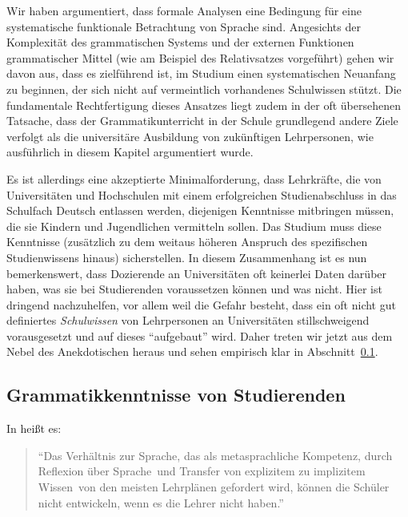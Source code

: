 Wir haben argumentiert, dass formale Analysen eine Bedingung für eine systematische funktionale Betrachtung von Sprache sind.
Angesichts der Komplexität des grammatischen Systems und der externen Funktionen grammatischer Mittel (wie am Beispiel des Relativsatzes vorgeführt) gehen wir davon aus, dass es zielführend ist, im Studium einen systematischen Neuanfang zu beginnen, der sich nicht auf vermeintlich vorhandenes Schulwissen stützt.
Die fundamentale Rechtfertigung dieses Ansatzes liegt zudem in der oft übersehenen Tatsache, dass der Grammatikunterricht in der Schule grundlegend andere Ziele verfolgt als die universitäre Ausbildung von zukünftigen Lehrpersonen, wie ausführlich in diesem Kapitel argumentiert wurde.

Es ist allerdings eine akzeptierte Minimalforderung, dass Lehrkräfte, die von Universitäten und Hochschulen mit einem erfolgreichen Studienabschluss in das Schulfach Deutsch entlassen werden, diejenigen Kenntnisse mitbringen müssen, die sie Kindern und Jugendlichen vermitteln sollen.
Das Studium muss diese Kenntnisse (zusätzlich zu dem weitaus höheren Anspruch des spezifischen Studienwissens hinaus) sicherstellen.
In diesem Zusammenhang ist es nun bemerkenswert, dass Dozierende an Universitäten oft keinerlei Daten darüber haben, was sie bei Studierenden voraussetzen können und was nicht.
Hier ist dringend nachzuhelfen, vor allem weil die Gefahr besteht, dass ein oft nicht gut definiertes \textit{Schulwissen} von Lehrpersonen an Universitäten stillschweigend vorausgesetzt und auf dieses "`aufgebaut"' wird.
Daher treten wir jetzt aus dem Nebel des Anekdotischen heraus und sehen empirisch klar in Abschnitt~\ref{sec:grammatikkentnissevonstudierenden}.

\subsection{Grammatikkenntnisse von Studierenden}
\label{sec:grammatikkentnissevonstudierenden}

In \citet{Eisenberg2004} heißt es:

\begin{quote}
  "`Das Verhältnis zur Sprache, das als \glq metasprachliche Kompetenz\grq, durch \glq Reflexion über Sprache\grq\ und \glq Transfer von explizitem zu implizitem Wissen\grq\ von den meisten Lehrplänen gefordert wird, können die Schüler nicht entwickeln, wenn es die Lehrer nicht haben."' \citep[23]{Eisenberg2004}
\end{quote}

